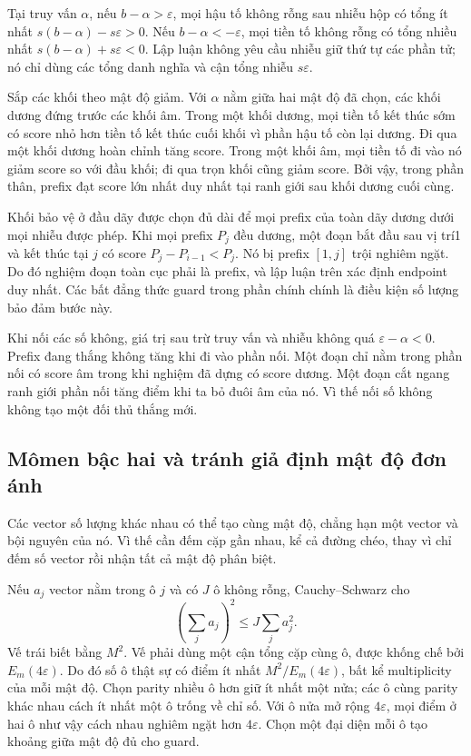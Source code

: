 Tại truy vấn $\alpha$, nếu $b-\alpha>\varepsilon$, mọi hậu tố không rỗng sau nhiễu hộp có tổng ít nhất $s(b-\alpha)-s\varepsilon>0$. Nếu $b-\alpha<-\varepsilon$, mọi tiền tố không rỗng có tổng nhiều nhất $s(b-\alpha)+s\varepsilon<0$. Lập luận không yêu cầu nhiễu giữ thứ tự các phần tử; nó chỉ dùng các tổng danh nghĩa và cận tổng nhiễu $s\varepsilon$.

Sắp các khối theo mật độ giảm. Với $\alpha$ nằm giữa hai mật độ đã chọn, các khối dương đứng trước các khối âm. Trong một khối dương, mọi tiền tố kết thúc sớm có score nhỏ hơn tiền tố kết thúc cuối khối vì phần hậu tố còn lại dương. Đi qua một khối dương hoàn chỉnh tăng score. Trong một khối âm, mọi tiền tố đi vào nó giảm score so với đầu khối; đi qua trọn khối cũng giảm score. Bởi vậy, trong phần thân, prefix đạt score lớn nhất duy nhất tại ranh giới sau khối dương cuối cùng.

Khối bảo vệ ở đầu dãy được chọn đủ dài để mọi prefix của toàn dãy dương dưới mọi nhiễu được phép. Khi mọi prefix $P_j$ đều dương, một đoạn bắt đầu sau vị trí1 và kết thúc tại $j$ có score $P_j-P_{i-1}<P_j$. Nó bị prefix $[1,j]$ trội nghiêm ngặt. Do đó nghiệm đoạn toàn cục phải là prefix, và lập luận trên xác định endpoint duy nhất. Các bất đẳng thức guard trong phần chính chính là điều kiện số lượng bảo đảm bước này.

Khi nối các số không, giá trị sau trừ truy vấn và nhiễu không quá $\varepsilon-\alpha<0$. Prefix đang thắng không tăng khi đi vào phần nối. Một đoạn chỉ nằm trong phần nối có score âm trong khi nghiệm đã dựng có score dương. Một đoạn cắt ngang ranh giới phần nối tăng điểm khi ta bỏ đuôi âm của nó. Vì thế nối số không không tạo một đối thủ thắng mới.

\subsection{Mômen bậc hai và tránh giả định mật độ đơn ánh}
Các vector số lượng khác nhau có thể tạo cùng mật độ, chẳng hạn một vector và bội nguyên của nó. Vì thế cần đếm cặp gần nhau, kể cả đường chéo, thay vì chỉ đếm số vector rồi nhận tất cả mật độ phân biệt.

Nếu $a_j$ vector nằm trong ô $j$ và có $J$ ô không rỗng, Cauchy--Schwarz cho
\[
\left(\sum_j a_j\right)^2\le J\sum_j a_j^2.
\]
Vế trái biết bằng $M^2$. Vế phải dùng một cận tổng cặp cùng ô, được khống chế bởi $E_m(4\varepsilon)$. Do đó số ô thật sự có điểm ít nhất $M^2/E_m(4\varepsilon)$, bất kể multiplicity của mỗi mật độ. Chọn parity nhiều ô hơn giữ ít nhất một nửa; các ô cùng parity khác nhau cách ít nhất một ô trống về chỉ số. Với ô nửa mở rộng $4\varepsilon$, mọi điểm ở hai ô như vậy cách nhau nghiêm ngặt hơn $4\varepsilon$. Chọn một đại diện mỗi ô tạo khoảng giữa mật độ đủ cho guard.

